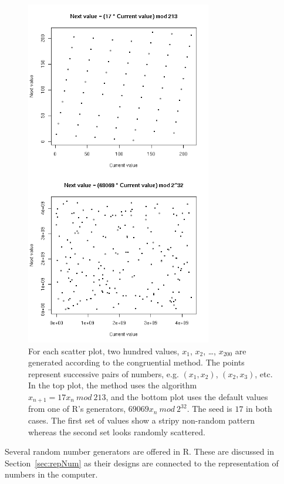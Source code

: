 \begin{figure}
\includegraphics[height=6in]{computerIntro/images/cong.png}
\caption{For each scatter plot, two hundred values, $x_1$, $x_2$,
  \ldots, $x_{200}$ are generated according to the congruential
  method.  The points represent successive pairs of numbers,
  e.g. $(x_1, x_2)$, $(x_2, x_3)$, etc.  In the top plot, the method
  uses the algorithm $x_{n+1} = 17x_n~mod~213$, and the bottom plot
  uses the default values from one of R's generators, $69069x_n
  ~mod~2^{32}$.  The seed is $17$ in both cases. The first set of
  values show a stripy non-random pattern whereas the second set
  looks randomly scattered. }
\label{fig:congPlot}
\end{figure}


Several random number generators are offered in R. These are discussed
in Section~\ref{sec:repNum} as their designs are connected to the
representation of numbers in the computer.



